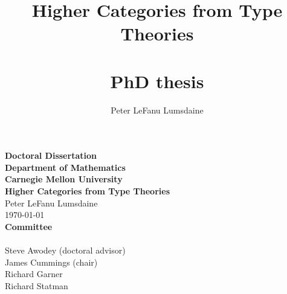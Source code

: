 \documentclass[11pt]{amsbook}
\begin{document}
\frontmatter



\title{Higher Categories from Type Theories \\~\\ \normalsize PhD thesis}

\author[P. LeF. Lumsdaine]{Peter LeFanu Lumsdaine}


\maketitle
\newpage
\thispagestyle{empty}
\begin{center}
  {\large\textbf{Doctoral Dissertation \\ Department of Mathematics \\ Carnegie Mellon University}}\\
  \vspace{1cm}
  {\Large\textbf{Higher Categories from Type Theories}}\\
  \vspace{.5cm}
  Peter LeFanu Lumsdaine\\
  \vspace{.5cm}
  \today\\
  \vspace{3cm}
  \textbf{Committee}\\~\\
  Steve Awodey (doctoral advisor)\\
  James Cummings (chair) \\
  Richard Garner \\
  Richard Statman \\

\end{center}
 




\tableofcontents
\end{document}
